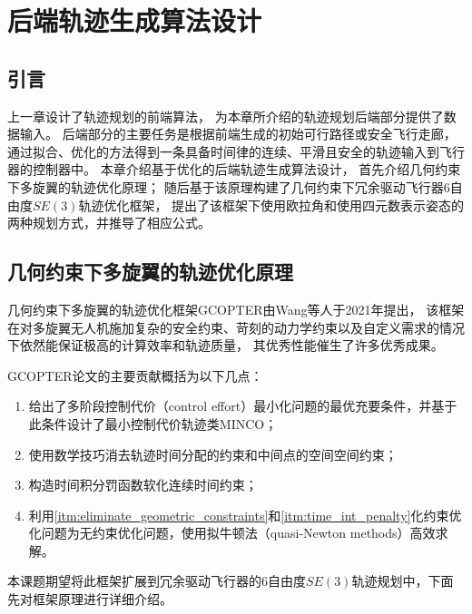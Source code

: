 
\chapter{后端轨迹生成算法设计}\label{chap:back_end_trajectory_generation}

\section{引言}\label{sec:intro_4}
上一章设计了轨迹规划的前端算法，
为本章所介绍的轨迹规划后端部分提供了数据输入。
后端部分的主要任务是根据前端生成的初始可行路径或安全飞行走廊，
通过拟合、优化的方法得到一条具备时间律的连续、平滑且安全的轨迹输入到飞行器的控制器中。
本章介绍基于优化的后端轨迹生成算法设计，
首先介绍几何约束下多旋翼的轨迹优化原理；
随后基于该原理构建了几何约束下冗余驱动飞行器6自由度$SE(3)$轨迹优化框架，
提出了该框架下使用欧拉角和使用四元数表示姿态的两种规划方式，并推导了相应公式。

\section{几何约束下多旋翼的轨迹优化原理}\label{sec:geometrically_constrained_trajectory_optimization}
几何约束下多旋翼的轨迹优化框架GCOPTER\cite{wang2022geometrically}由Wang等人于2021年提出，
该框架在对多旋翼无人机施加复杂的安全约束、苛刻的动力学约束以及自定义需求的情况下依然能保证极高的计算效率和轨迹质量，
其优秀性能催生了许多优秀成果\cite{han2021fast, zhou2022swarm}。

GCOPTER论文的主要贡献概括为以下几点：
\begin{enumerate}
  \renewcommand{\labelenumi}{(\theenumi)}
  \item 给出了多阶段控制代价（control effort）最小化问题的最优充要条件，并基于此条件设计了最小控制代价轨迹类MINCO；
  \item 使用数学技巧消去轨迹时间分配的约束和中间点的空间空间约束；\label{itm:eliminate_geometric_constraints}
  \item 构造时间积分罚函数软化连续时间约束；\label{itm:time_int_penalty}
  \item 利用\ref{itm:eliminate_geometric_constraints}和\ref{itm:time_int_penalty}化约束优化问题为无约束优化问题，使用拟牛顿法（quasi-Newton methods）高效求解。
\end{enumerate}
本课题期望将此框架扩展到冗余驱动飞行器的6自由度$SE(3)$轨迹规划中，下面先对框架原理进行详细介绍。

